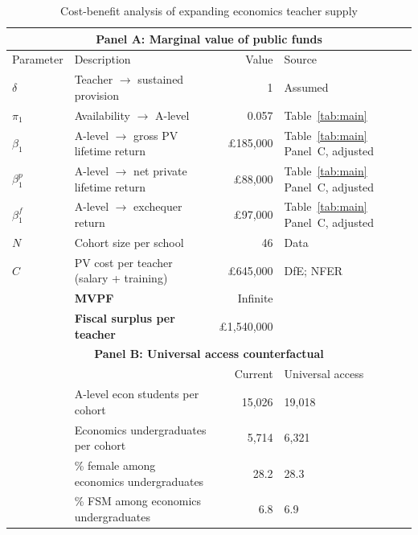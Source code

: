\begin{table}[htbp]
\centering
\caption{Cost-benefit analysis of expanding economics teacher supply}
\label{tab:mvpf}
\footnotesize\setlength{\tabcolsep}{4pt}
\begin{tabular}{l l r l}
\toprule
\multicolumn{4}{c}{\textbf{Panel A: Marginal value of public funds}} \\
\midrule
Parameter    & Description                              & Value         & Source \\
\midrule
$\delta$     & Teacher $\rightarrow$ sustained provision & 1             & Assumed \\
$\pi_1$      & Availability $\rightarrow$ A-level       & 0.057            & Table~\ref{tab:main} \\
$\beta_1$    & A-level $\rightarrow$ gross PV lifetime return  & \pounds 185,000           & Table~\ref{tab:main} Panel~C, adjusted\\
$\beta_1^p$  & A-level $\rightarrow$ net private lifetime return & \pounds 88,000           & Table~\ref{tab:main} Panel~C, adjusted\\
$\beta_1^f$  & A-level $\rightarrow$ exchequer return      & \pounds 97,000           & Table~\ref{tab:main} Panel~C, adjusted\\
$N$          & Cohort size per school                   & 46            & Data \\
$C$          & PV cost per teacher (salary + training)  & \pounds 645,000           & DfE; NFER \\
\addlinespace
             & \textbf{MVPF}                            & Infinite   &  \\
             & \textbf{Fiscal surplus per teacher}      & \pounds 1,540,000   &  \\
\midrule
\multicolumn{4}{c}{\textbf{Panel B: Universal access counterfactual}} \\
\midrule
             &                                          & Current       & Universal access \\
\midrule
             & A-level econ students per cohort         & 15,026            & 19,018 \\
             & Economics undergraduates per cohort      & 5,714            & 6,321 \\
\addlinespace
             & \% female among economics undergraduates & 28.2            & 28.3 \\
             & \% FSM among economics undergraduates    & 6.8            & 6.9 \\

\end{tabular}
\end{table}
